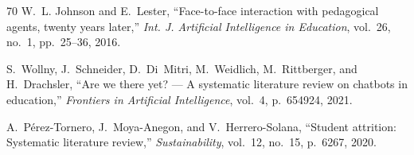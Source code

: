 \begin{thebibliography}{70}
W.~L. Johnson and E.~Lester,
``Face-to-face interaction with pedagogical agents, twenty years later,''
\textit{Int. J. Artificial Intelligence in Education}, vol.~26, no.~1, pp.~25--36, 2016.

S.~Wollny, J.~Schneider, D.~Di~Mitri, M.~Weidlich, M.~Rittberger, and H.~Drachsler,
``Are we there yet? — A systematic literature review on chatbots in education,''
\textit{Frontiers in Artificial Intelligence}, vol.~4, p.~654924, 2021.

A.~Pérez-Tornero, J.~Moya-Anegon, and V.~Herrero-Solana,
``Student attrition: Systematic literature review,''
\textit{Sustainability}, vol.~12, no.~15, p.~6267, 2020.

\end{thebibliography}
